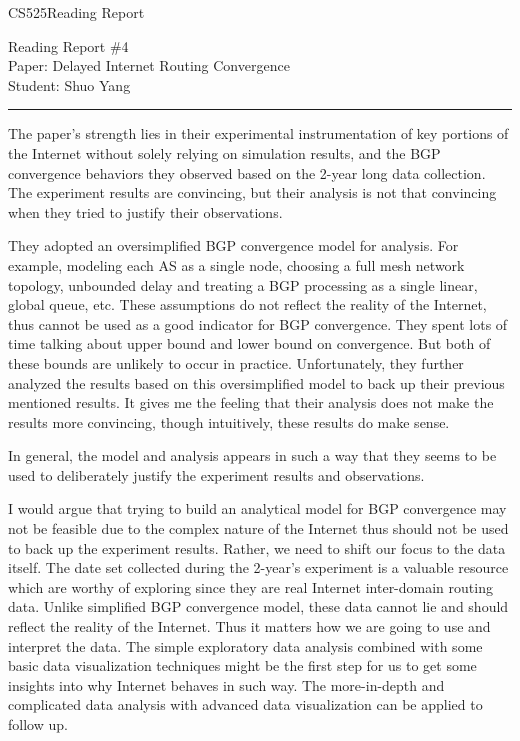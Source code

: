 \documentclass[11pt]{article}
\def\CourseCode{CS525}
\def\ReportNo{4}
\def\Category{Reading Report}
\def\PaperTitle{Delayed Internet Routing Convergence}
\def\Author{Shuo Yang}
\begin{document}
\noindent

\CourseCode \hfill \Category

\begin{center}
Reading Report \#\ReportNo\\
Paper: \PaperTitle\\
Student: \Author\\
\end{center}

\hrule\smallskip
\vspace{1.5em}

The paper's strength lies in their experimental instrumentation of key
portions of the Internet without solely relying on simulation results, 
and the BGP convergence behaviors they observed based on the 2-year
long data collection. The experiment results are convincing, but their
analysis is not that convincing when they tried to justify their
observations. 

\vspace{0.5em}
They adopted an oversimplified BGP convergence model for analysis. For
example, modeling each AS as a single node, choosing a full mesh
network topology, unbounded delay and treating a BGP processing as a
single linear, global queue, etc. These assumptions do not reflect the
reality of the Internet, thus cannot be used as a good indicator for
BGP convergence. They spent lots of time talking about upper bound and
lower bound on convergence. But both of these bounds are unlikely to
occur in practice. Unfortunately, they further analyzed the results
based on this oversimplified model to back up their previous mentioned
results. It gives me the feeling that their analysis does not make
the results more convincing, though intuitively, these results do make
sense.

\vspace{0.5em}
In general, the model and analysis appears in such a way that they
seems to be used to deliberately justify the experiment results and
observations.

\vspace{0.5em}
I would argue that trying to build an analytical model for BGP
convergence may not be feasible due to the complex nature of the
Internet thus should not be used to back up the experiment
results. Rather, we need to shift our focus to the data itself. The
date set collected during 
the 2-year's experiment is a valuable resource which are worthy of
exploring since they are real Internet inter-domain routing
data. Unlike simplified BGP convergence model, these data cannot lie
and should reflect the reality of the Internet. Thus it matters how we
are going to use and interpret the data. The simple
exploratory data analysis combined with some basic data visualization
techniques might be the first step for us to get some insights into why
Internet behaves in such way. The more-in-depth and complicated data
analysis with advanced data visualization can be applied to follow
up.
\end{document}
